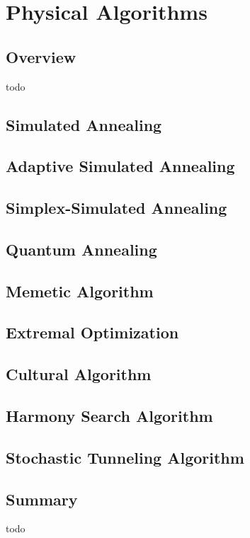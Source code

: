 


\chapter{Physical Algorithms}
\label{ch:physical}

\section{Overview}
todo




\section{Simulated Annealing}
\section{Adaptive Simulated Annealing}
\section{Simplex-Simulated Annealing}
\section{Quantum Annealing}
\section{Memetic Algorithm}
\section{Extremal Optimization}
\section{Cultural Algorithm}
\section{Harmony Search Algorithm}
\section{Stochastic Tunneling Algorithm}


\section{Summary}
todo
